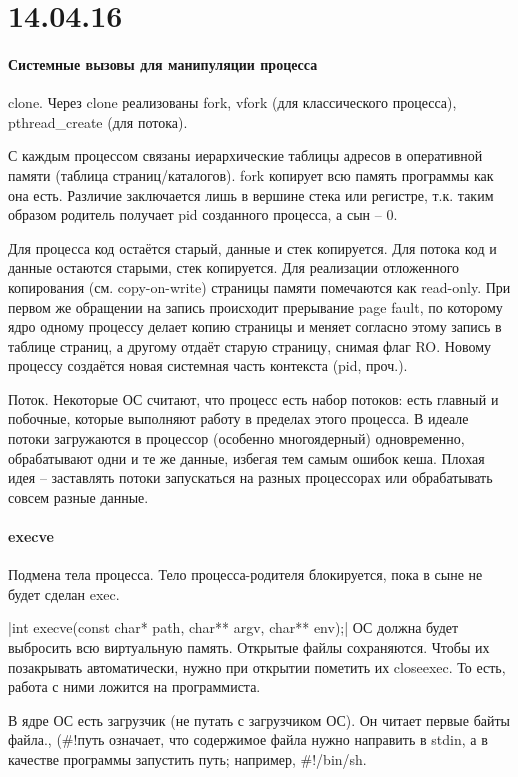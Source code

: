 \documentclass[a4paper,10pt]{article}
\begin{document}
\section{14.04.16}
\paragraph{Системные вызовы для манипуляции процесса}
clone. Через clone реализованы fork, vfork (для классического процесса), pthread\_create (для потока).

С каждым процессом связаны иерархические таблицы адресов в оперативной памяти (таблица страниц/каталогов). fork копирует всю память программы как она есть. Различие заключается лишь в вершине стека или регистре, т.к. таким образом родитель получает pid созданного процесса, а сын -- 0. 

Для процесса код остаётся старый, данные и стек копируется. Для потока код и данные остаются старыми, стек копируется. Для реализации отложенного копирования (см. copy-on-write) страницы памяти помечаются как read-only. При первом же обращении на запись происходит прерывание page fault, по которому ядро одному процессу делает копию страницы и меняет согласно этому запись в таблице страниц, а другому отдаёт старую страницу, снимая флаг RO. Новому процессу создаётся новая системная часть контекста (pid, проч.).

Поток.
Некоторые ОС считают, что процесс есть набор потоков: есть главный и побочные, которые выполняют работу в пределах этого процесса. В идеале потоки загружаются в процессор (особенно многоядерный) одновременно, обрабатывают одни и те же данные, избегая тем самым ошибок кеша. Плохая идея -- заставлять потоки запускаться на разных процессорах или обрабатывать совсем разные данные.

\paragraph{execve}
Подмена тела процесса. Тело процесса-родителя блокируется, пока в сыне не будет сделан exec. 

|int execve(const char* path, char** argv, char** env);|
ОС должна будет выбросить всю виртуальную память.
Открытые файлы сохраняются. Чтобы их позакрывать автоматически, нужно при открытии пометить их closeexec. То есть, работа с ними ложится на программиста.

В ядре ОС есть загрузчик (не путать с загрузчиком ОС). Он читает первые байты файла.,
(\#!путь означает, что содержимое файла нужно направить в stdin, а в качестве программы запустить путь; например, \#!/bin/sh.
\end{document}

